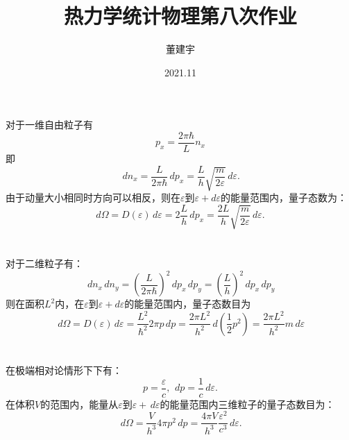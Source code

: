 \documentclass[a4paper,12pt]{article}
\title{热力学统计物理第八次作业}
\date{2021.11}
\author{董建宇}
\begin{document}
\maketitle

\titleformat{\section}[hang]{\small}{\thesection}{0.8em}{}{}
\titleformat{\subsection}[hang]{\small}{\thesubsection}{0.8em}{}{}

\section{}
对于一维自由粒子有
\begin{equation}\nonumber
	p_x = \frac{2\pi\hbar}{L}n_x
\end{equation}
即
\begin{equation}\nonumber
	\,dn_x = \frac{L}{2\pi\hbar}\,dp_x = \frac{L}{h} \sqrt{\frac{m}{2\varepsilon}} \,d\varepsilon.
\end{equation}
由于动量大小相同时方向可以相反，则在$\varepsilon$到$\varepsilon + d\varepsilon$的能量范围内，量子态数为：
\begin{equation}\nonumber
	d\Omega = D(\varepsilon)\,d\varepsilon = 2\frac{L}{h} \,dp_x = \frac{2L}{h} \sqrt{\frac{m}{2\varepsilon}} \,d\varepsilon.
\end{equation}


\section{}
对于二维粒子有：
\begin{equation}\nonumber
	\,dn_x\,dn_y = \left(\frac{L}{2\pi\hbar}\right)^2\,dp_x\,dp_y = \left( \frac{L}{h} \right)^2 \,dp_x\,dp_y
\end{equation}
则在面积$L^2$内，在$\varepsilon$到$\varepsilon + d\varepsilon$的能量范围内，量子态数目为
\begin{equation}\nonumber
	\,d\Omega = D(\varepsilon) \,d\varepsilon = \frac{L^2}{\hbar^2} 2\pi p\,dp = \frac{2\pi L^2}{h^2}\,d\left( \frac{1}{2}p^2 \right) = \frac{2\pi L^2}{h^2}m\,d\varepsilon
\end{equation}


\section{}
在极端相对论情形下下有：
\begin{equation}\nonumber
	p = \frac{\varepsilon}{c},~\,dp = \frac{1}{c}\,d\varepsilon.
\end{equation}
在体积$V$的范围内，能量从$\varepsilon$到$\varepsilon + \,d\varepsilon$的能量范围内三维粒子的量子态数目为：
\begin{equation}\nonumber
	\,d\Omega = \frac{V}{h^3} 4\pi p^2\,dp = \frac{4\pi V}{h^3}\frac{\varepsilon^2}{c^3}\,d\varepsilon.
\end{equation}
\end{document}
